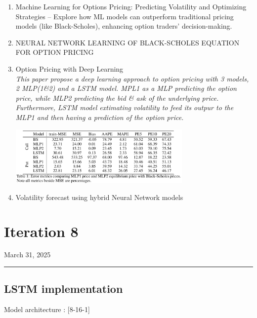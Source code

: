 \documentclass[letterpaper,11pt]{article}
\begin{document}
\begin{enumerate}
  \item Machine Learning for Options Pricing: Predicting Volatility and Optimizing Strategies – Explore how ML models can outperform   traditional pricing models (like Black-Scholes), enhancing option traders' decision-making.\\
  \emph{}


  \item NEURAL NETWORK LEARNING OF BLACK-SCHOLES
  EQUATION FOR OPTION PRICING\\
  \emph{}

  \item Option Pricing with Deep Learning\\
  \emph{This paper propose a deep learning approach to option pricing with 3 models, 2 MLP(1\&2) and a LSTM model. MPL1 as a MLP predicting the option price, while MLP2 predicting the bid \& ask of the underlying price. Furthermore, LSTM model extimating volatility to feed its outpur to the MLP1 and then having a prediction of the option price.}
  \begin{center}
    \includegraphics[width=0.7\textwidth]{img/res_lit_paper_5.png}
  \end{center}

  \item Volatility forecast using hybrid Neural Network models \\



\end{enumerate}




\newpage
\section*{Iteration 8}
\begin{flushright}
March 31, 2025
\end{flushright}
\hrule
\vspace{0.2in}

\subsection*{LSTM implementation}
Model architecture : [8-16-1]
\end{document}
